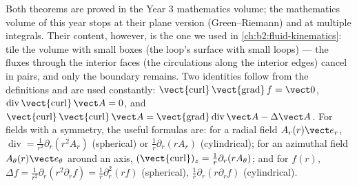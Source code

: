 \begin{remark}\label{rem:b2:maxwell-equations:whyadmitted}
Both theorems are proved in the Year 3 mathematics volume; the
mathematics volume of this year stops at their plane version
(Green--Riemann) and at multiple integrals. Their content, however, is
the one we used in \cref{ch:b2:fluid-kinematics}: tile the volume with
small boxes (the loop's surface with small loops) --- the fluxes
through the interior faces (the circulations along the interior
edges) cancel in pairs, and only the boundary remains. Two identities
follow from the definitions and are used constantly:
$\operatorname{\vect{curl}}\operatorname{\vect{grad}}f = \vect 0$,
$\operatorname{div}\operatorname{\vect{curl}}\vect A = 0$, and
$\operatorname{\vect{curl}}\operatorname{\vect{curl}}\vect A = \operatorname{\vect{grad}}
\operatorname{div}\vect A - \Delta\vect A$. For fields with a symmetry, the
useful formulas are: for a radial field $A_r(r)\vect e_r$, $\operatorname{div}
= \frac1{r^2}\partial_r(r^2A_r)$ (spherical) or $\frac1r\partial_r(rA_r)$
(cylindrical); for an azimuthal field $A_\theta(r)\vect e_\theta$ around an
axis, $(\operatorname{\vect{curl}})_z = \frac1r\partial_r(rA_\theta)$; and for $f(r)$,
$\Delta f = \frac1{r^2}\partial_r(r^2\partial_rf) = \frac1r\partial_r^2(rf)$ (spherical),
$\frac1r\partial_r(r\partial_rf)$ (cylindrical).
\end{remark}

